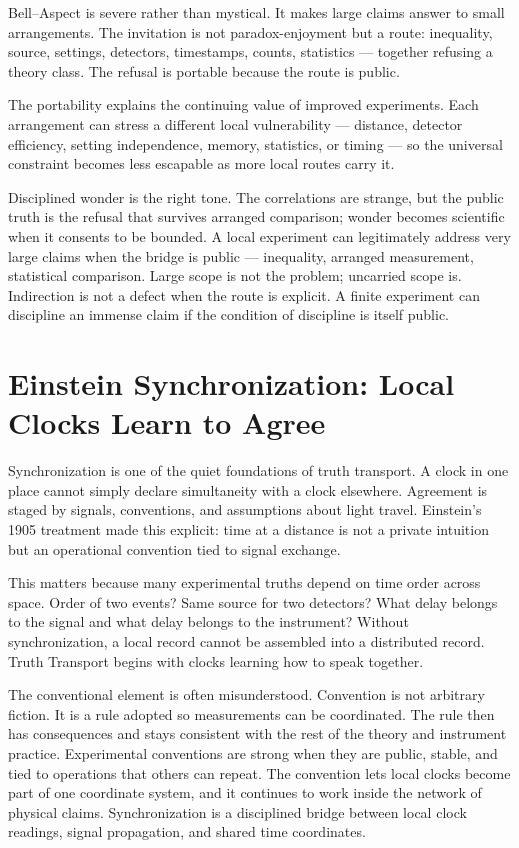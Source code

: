 Bell--Aspect is severe rather than mystical. It makes large claims answer
to small arrangements. The invitation is not paradox-enjoyment but a
route: inequality, source, settings, detectors, timestamps, counts,
statistics --- together refusing a theory class. The refusal is portable
because the route is public.

The portability explains the continuing value of improved experiments.
Each arrangement can stress a different local vulnerability --- distance,
detector efficiency, setting independence, memory, statistics, or timing
--- so the universal constraint becomes less escapable as more local
routes carry it.

Disciplined wonder is the right tone. The correlations are strange, but
the public truth is the refusal that survives arranged comparison; wonder
becomes scientific when it consents to be bounded. A local experiment can
legitimately address very large claims when the bridge is public ---
inequality, arranged measurement, statistical comparison. Large scope is
not the problem; uncarried scope is. Indirection is not a defect when the
route is explicit. A finite experiment can discipline an immense claim if
the condition of discipline is itself public.

\section{Einstein Synchronization: Local Clocks Learn to Agree}

Synchronization is one of the quiet foundations of truth transport. A clock
in one place cannot simply declare simultaneity with a clock elsewhere.
Agreement is staged by signals, conventions, and assumptions about light
travel. Einstein's 1905 treatment made this explicit: time at a distance is
not a private intuition but an operational convention tied to signal
exchange.

This matters because many experimental truths depend on time order across
space. Order of two events? Same source for two detectors? What delay
belongs to the signal and what delay belongs to the instrument? Without
synchronization, a local record cannot be assembled into a distributed
record. Truth Transport begins with clocks learning how to speak together.

The conventional element is often misunderstood. Convention is not
arbitrary fiction. It is a rule adopted so measurements can be
coordinated. The rule then has consequences and stays consistent with the
rest of the theory and instrument practice. Experimental conventions are
strong when they are public, stable, and tied to operations that others
can repeat. The convention lets local clocks become part of one coordinate
system, and it continues to work inside the network of physical claims.
Synchronization is a disciplined bridge between local clock readings,
signal propagation, and shared time coordinates.

